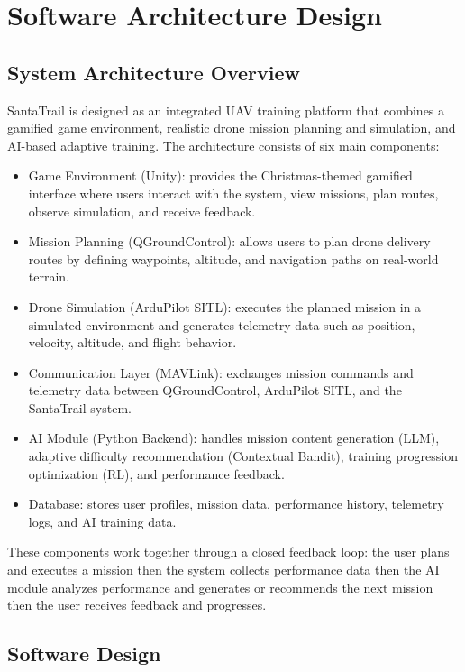 \chapter{Software Architecture Design}

\section{System Architecture Overview}

SantaTrail is designed as an integrated UAV training platform that combines a gamified game environment, realistic drone mission planning and simulation, and AI-based adaptive training. 
The architecture consists of six main components:

\begin{itemize}
    \item Game Environment (Unity): provides the Christmas-themed gamified interface where users interact with the system, view missions, plan routes, observe simulation, and receive feedback.
    \item Mission Planning (QGroundControl): allows users to plan drone delivery routes by defining waypoints, altitude, and navigation paths on real-world terrain.
    \item Drone Simulation (ArduPilot SITL): executes the planned mission in a simulated environment and generates telemetry data such as position, velocity, altitude, and flight behavior.
    \item Communication Layer (MAVLink): exchanges mission commands and telemetry data between QGroundControl, ArduPilot SITL, and the SantaTrail system.
    \item AI Module (Python Backend): handles mission content generation (LLM), adaptive difficulty recommendation (Contextual Bandit), training progression optimization (RL), and performance feedback.
    \item Database: stores user profiles, mission data, performance history, telemetry logs, and AI training data.
\end{itemize}

These components work together through a closed feedback loop: the user plans and executes a mission then the system collects performance data then the AI module analyzes performance and generates or recommends the next mission then the user receives feedback and progresses.

\section{Software Design}

